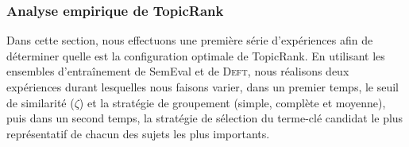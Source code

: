       \subsubsection{Analyse empirique de TopicRank}
      \label{subsubsec:main:domain_independent_keyphrase_extraction-unsupervised_automatic_keyphrase_extraction-evaluation-empirical_analysis_of_topicrank}
        Dans cette section, nous effectuons une première série d'expériences
        afin de déterminer quelle est la configuration optimale de TopicRank. En
        utilisant les ensembles d'entraînement de SemEval et de \textsc{Deft},
        nous réalisons deux expériences durant lesquelles nous faisons varier,
        dans un premier temps, le seuil de similarité ($\zeta$) et la stratégie
        de groupement (simple, complète et moyenne), puis dans un second temps,
        la stratégie de sélection du terme-clé candidat le plus représentatif de
        chacun des sujets les plus importants.
